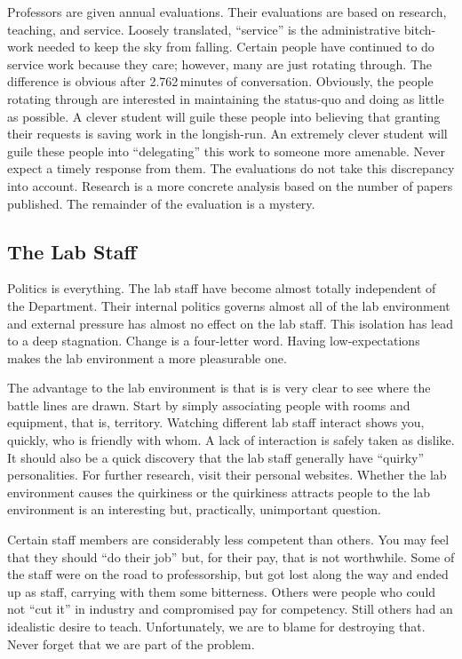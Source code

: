 \documentclass{book}
\begin{document}
Professors are given annual evaluations. Their evaluations are based on research, teaching, and service. Loosely translated, ``service'' is the administrative bitch-work needed to keep the sky from falling. Certain people have continued to do service work because they care; however, many are just rotating through. The difference is obvious after 2.762\,minutes of conversation. Obviously, the people rotating through are interested in maintaining the status-quo and doing as little as possible. A clever student will guile these people into believing that granting their requests is saving work in the longish-run. An extremely clever student will guile these people into ``delegating'' this work to someone more amenable. Never expect a timely response from them. The evaluations do not take this discrepancy into account. Research is a more concrete analysis based on the number of papers published. The remainder of the evaluation is a mystery.

\subsection{The Lab Staff}
Politics is everything. The lab staff have become almost totally independent of the Department. Their internal politics governs almost all of the lab environment and external pressure has almost no effect on the lab staff. This isolation has lead to a deep stagnation. Change is a four-letter word. Having low-expectations makes the lab environment a more pleasurable one.

The advantage to the lab environment is that is is very clear to see where the battle lines are drawn. Start by simply associating people with rooms and equipment, that is, territory. Watching different lab staff interact shows you, quickly, who is friendly with whom. A lack of interaction is safely taken as dislike. It should also be a quick discovery that the lab staff generally have ``quirky'' personalities. For further research, visit their personal websites. Whether the lab environment causes the quirkiness or the quirkiness attracts people to the lab environment is an interesting but, practically, unimportant question.

Certain staff members are considerably less competent than others. You may feel that they should ``do their job'' but, for their pay, that is not worthwhile. Some of the staff were on the road to professorship, but got lost along the way and ended up as staff, carrying with them some bitterness. Others were people who could not ``cut it'' in industry and compromised pay for competency. Still others had an idealistic desire to teach. Unfortunately, we are to blame for destroying that. Never forget that we are part of the problem.
\end{document}
